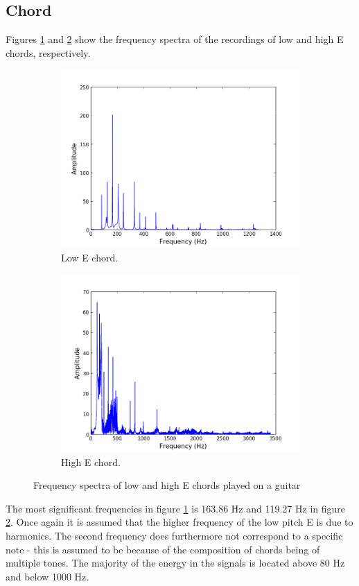 \subsection{Chord}
Figures \ref{fig:chord_low} and \ref{fig:chord_high} show the frequency spectra of the recordings of low and high E chords, respectively.
\begin{figure}[H]
\centering
\begin{subfigure}{0.49\textwidth}
\centering
\includegraphics[width=\textwidth]{figures/freqanal/chord_low.png}
\caption{Low E chord.}
\label{fig:chord_low}
\end{subfigure}
\begin{subfigure}{0.49\textwidth}
\centering
\includegraphics[width = \textwidth]{figures/freqanal/chord_high.png}
\caption{High E chord.}
\label{fig:chord_high}
\end{subfigure}
\caption{Frequency spectra of low and high E chords played on a guitar}
\label{fig:chord}
\end{figure}
The most significant frequencies in figure \ref{fig:chord_low} is 163.86 Hz and 119.27 Hz in figure \ref{fig:chord_high}. Once again it is assumed that the higher frequency of the low pitch E is due to harmonics. The second frequency does furthermore not correspond to a specific note - this is assumed to be because of the composition of chords being of multiple tones. The majority of the energy in the signals is located above 80 Hz and below 1000 Hz.
